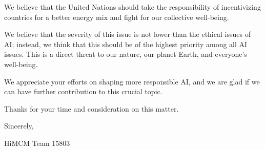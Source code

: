 \documentclass[12pt]{article}
\begin{document}
We believe that the United Nations should take the responsibility of incentivizing countries for a better energy mix and fight for our collective well-being.

We believe that the severity of this issue is not lower than the ethical issues of AI; instead, we think that this should be of the highest priority among all AI issues. This is a direct threat to our nature, our planet Earth, and everyone's well-being.

We appreciate your efforts on shaping more responsible AI, and we are glad if we can have further contribution to this crucial topic.

Thanks for your time and consideration on this matter.

\bigskip
\bigskip
\hfill Sincerely,

\hfill HiMCM Team 15803

\newpage

\let\Section\section 
\def\section*#1{\Section{#1}}


\end{document}

